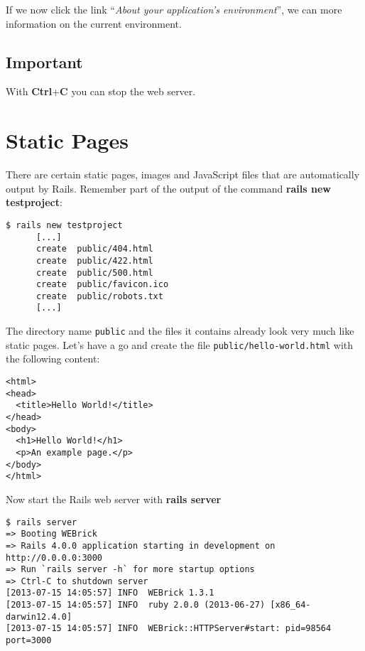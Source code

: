 \documentclass[a4paper]{book}
\begin{document}
If we now click the link “\emph{About your application's environment}”, we can more information on the current environment.

\subsection{Important}\label{important-3}

With \textbf{Ctrl}+\textbf{C} you can stop the web server.

\section{Static Pages}\label{static-pages}

There are certain static pages, images and JavaScript files that are automatically output by Rails. Remember part of the output of the command \textbf{rails new testproject}:

\begin{shaded}\begin{verbatim}
$ rails new testproject
      [...]
      create  public/404.html
      create  public/422.html
      create  public/500.html
      create  public/favicon.ico
      create  public/robots.txt
      [...]
\end{verbatim}\end{shaded}

The directory name \texttt{public} and the files it contains already look very much like static pages. Let's have a go and create the file \texttt{public/hello-world.html} with the following content:

\begin{shaded}\begin{verbatim}
<html>
<head>
  <title>Hello World!</title>
</head>
<body>
  <h1>Hello World!</h1>
  <p>An example page.</p>
</body>
</html>
\end{verbatim}\end{shaded}

Now start the Rails web server with \textbf{rails server}

\begin{shaded}\begin{verbatim}
$ rails server
=> Booting WEBrick
=> Rails 4.0.0 application starting in development on http://0.0.0.0:3000
=> Run `rails server -h` for more startup options
=> Ctrl-C to shutdown server
[2013-07-15 14:05:57] INFO  WEBrick 1.3.1
[2013-07-15 14:05:57] INFO  ruby 2.0.0 (2013-06-27) [x86_64-darwin12.4.0]
[2013-07-15 14:05:57] INFO  WEBrick::HTTPServer#start: pid=98564 port=3000
\end{verbatim}\end{shaded}
\end{document}
